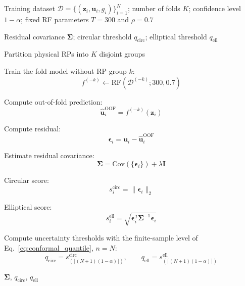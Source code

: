 \begin{algorithm}[t]
	\caption{RP-Grouped Covariance-Aware Uncertainty Estimation}
	\label{alg:uncertainty}
	\begin{algorithmic}[1]
		
		\Require
		Training dataset
		$\mathcal{D}=\{(\mathbf{z}_i,\mathbf{u}_i,g_i)\}_{i=1}^{N}$;
		number of folds $K$;
		confidence level $1-\alpha$;
		fixed RF parameters $T=300$ and $\rho=0.7$
		
		\Ensure
		Residual covariance $\boldsymbol{\Sigma}$;
		circular threshold $q_{\mathrm{circ}}$;
		elliptical threshold $q_{\mathrm{ell}}$
		
		\State Partition physical RPs into $K$ disjoint groups
		
		
		\State Train the fold model without RP group $k$:
		\[
		f^{(-k)}
		\leftarrow
		\mathrm{RF}
		\left(
		\mathcal{D}^{(-k)};
		300,
		0.7
		\right)
		\]
		
		
		\State Compute out-of-fold prediction:
		\[
		\hat{\mathbf{u}}_i^{\mathrm{OOF}}
		=
		f^{(-k)}(\mathbf{z}_i)
		\]
		
		\State Compute residual:
		\[
		\boldsymbol{\epsilon}_i
		=
		\mathbf{u}_i
		-
		\hat{\mathbf{u}}_i^{\mathrm{OOF}}
		\]
		
		\EndFor
		
		\EndFor
		
		\State Estimate residual covariance:
		\[
		\boldsymbol{\Sigma}
		=
		\mathrm{Cov}
		\left(
		\{\boldsymbol{\epsilon}_i\}
		\right)
		+
		\lambda\mathbf{I}
		\]
		
		
		\State Circular score:
		\[
		s_i^{\mathrm{circ}}
		=
		\|\boldsymbol{\epsilon}_i\|_2
		\]
		
		\State Elliptical score:
		\[
		s_i^{\mathrm{ell}}
		=
		\sqrt{
			\boldsymbol{\epsilon}_i^{T}
			\boldsymbol{\Sigma}^{-1}
			\boldsymbol{\epsilon}_i
		}
		\]
		
		\EndFor
		
		\State Compute uncertainty thresholds with the finite-sample level of Eq.~\eqref{eq:conformal_quantile}, $n=N$:
		\[
		q_{\mathrm{circ}}
		=
		s^{\mathrm{circ}}_{\left(\lceil (N+1)(1-\alpha)\rceil\right)},
		\qquad
		q_{\mathrm{ell}}
		=
		s^{\mathrm{ell}}_{\left(\lceil (N+1)(1-\alpha)\rceil\right)}
		\]
		
		\State \Return
		$\boldsymbol{\Sigma}$,
		$q_{\mathrm{circ}}$,
		$q_{\mathrm{ell}}$
		
	\end{algorithmic}
\end{algorithm}